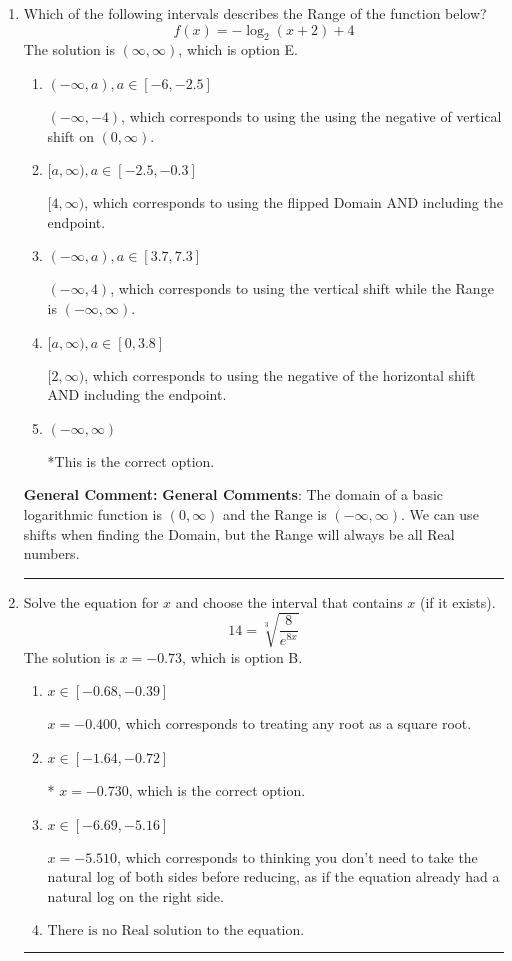 \documentclass{extbook}[14pt]
\newcommand{\litem}[1]{\item #1

\rule{\textwidth}{0.4pt}}
\begin{document}
\begin{enumerate}\litem{
Which of the following intervals describes the Range of the function below?
\[ f(x) = -\log_2{(x+2)}+4 \]
The solution is \( (\infty, \infty) \), which is option E.\begin{enumerate}[label=\Alph*.]
\item \( (-\infty, a), a \in [-6, -2.5] \)

$(-\infty, -4)$, which corresponds to using the using the negative of vertical shift on $(0, \infty)$.
\item \( [a, \infty), a \in [-2.5, -0.3] \)

$[4, \infty)$, which corresponds to using the flipped Domain AND including the endpoint.
\item \( (-\infty, a), a \in [3.7, 7.3] \)

$(-\infty, 4)$, which corresponds to using the vertical shift while the Range is $(-\infty, \infty)$.
\item \( [a, \infty), a \in [0, 3.8] \)

$[2, \infty)$, which corresponds to using the negative of the horizontal shift AND including the endpoint.
\item \( (-\infty, \infty) \)

*This is the correct option.
\end{enumerate}

\textbf{General Comment:} \textbf{General Comments}: The domain of a basic logarithmic function is $(0, \infty)$ and the Range is $(-\infty, \infty)$. We can use shifts when finding the Domain, but the Range will always be all Real numbers.
}
\litem{
 Solve the equation for $x$ and choose the interval that contains $x$ (if it exists).
\[  14 = \sqrt[3]{\frac{8}{e^{8x}}} \]
The solution is \( x = -0.73 \), which is option B.\begin{enumerate}[label=\Alph*.]
\item \( x \in [-0.68, -0.39] \)

$x = -0.400$, which corresponds to treating any root as a square root.
\item \( x \in [-1.64, -0.72] \)

* $x = -0.730$, which is the correct option.
\item \( x \in [-6.69, -5.16] \)

$x = -5.510$, which corresponds to thinking you don't need to take the natural log of both sides before reducing, as if the equation already had a natural log on the right side.
\item \( \text{There is no Real solution to the equation.} \)


\end{enumerate}}
\end{enumerate}
\end{document}
